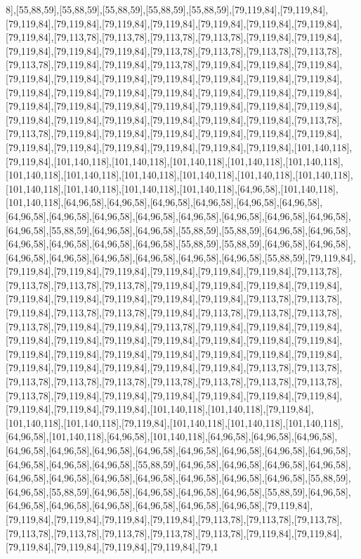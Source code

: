 8],[55,88,59],[55,88,59],[55,88,59],[55,88,59],[55,88,59],[79,119,84],[79,119,84],[79,119,84],[79,119,84],[79,119,84],[79,119,84],[79,119,84],[79,119,84],[79,119,84],[79,119,84],[79,113,78],[79,113,78],[79,113,78],[79,113,78],[79,119,84],[79,119,84],[79,119,84],[79,119,84],[79,119,84],[79,113,78],[79,113,78],[79,113,78],[79,113,78],[79,113,78],[79,119,84],[79,119,84],[79,113,78],[79,119,84],[79,119,84],[79,119,84],[79,119,84],[79,119,84],[79,119,84],[79,119,84],[79,119,84],[79,119,84],[79,119,84],[79,119,84],[79,119,84],[79,119,84],[79,119,84],[79,119,84],[79,119,84],[79,119,84],[79,119,84],[79,119,84],[79,119,84],[79,119,84],[79,119,84],[79,119,84],[79,119,84],[79,119,84],[79,119,84],[79,119,84],[79,119,84],[79,119,84],[79,119,84],[79,113,78],[79,113,78],[79,119,84],[79,119,84],[79,119,84],[79,119,84],[79,119,84],[79,119,84],[79,119,84],[79,119,84],[79,119,84],[79,119,84],[79,119,84],[79,119,84],[101,140,118],[79,119,84],[101,140,118],[101,140,118],[101,140,118],[101,140,118],[101,140,118],[101,140,118],[101,140,118],[101,140,118],[101,140,118],[101,140,118],[101,140,118],[101,140,118],[101,140,118],[101,140,118],[101,140,118],[64,96,58],[101,140,118],[101,140,118],[64,96,58],[64,96,58],[64,96,58],[64,96,58],[64,96,58],[64,96,58],[64,96,58],[64,96,58],[64,96,58],[64,96,58],[64,96,58],[64,96,58],[64,96,58],[64,96,58],[64,96,58],[55,88,59],[64,96,58],[64,96,58],[55,88,59],[55,88,59],[64,96,58],[64,96,58],[64,96,58],[64,96,58],[64,96,58],[64,96,58],[55,88,59],[55,88,59],[64,96,58],[64,96,58],[64,96,58],[64,96,58],[64,96,58],[64,96,58],[64,96,58],[64,96,58],[55,88,59],[79,119,84],[79,119,84],[79,119,84],[79,119,84],[79,119,84],[79,119,84],[79,119,84],[79,113,78],[79,113,78],[79,113,78],[79,113,78],[79,119,84],[79,119,84],[79,119,84],[79,119,84],[79,119,84],[79,119,84],[79,119,84],[79,119,84],[79,119,84],[79,113,78],[79,113,78],[79,119,84],[79,113,78],[79,113,78],[79,119,84],[79,113,78],[79,113,78],[79,113,78],[79,113,78],[79,119,84],[79,119,84],[79,113,78],[79,119,84],[79,119,84],[79,119,84],[79,119,84],[79,119,84],[79,119,84],[79,119,84],[79,119,84],[79,119,84],[79,119,84],[79,119,84],[79,119,84],[79,119,84],[79,119,84],[79,119,84],[79,119,84],[79,119,84],[79,119,84],[79,119,84],[79,119,84],[79,119,84],[79,119,84],[79,113,78],[79,113,78],[79,113,78],[79,113,78],[79,113,78],[79,113,78],[79,113,78],[79,113,78],[79,113,78],[79,113,78],[79,119,84],[79,119,84],[79,119,84],[79,119,84],[79,119,84],[79,119,84],[79,119,84],[79,119,84],[79,119,84],[101,140,118],[101,140,118],[79,119,84],[101,140,118],[101,140,118],[79,119,84],[101,140,118],[101,140,118],[101,140,118],[64,96,58],[101,140,118],[64,96,58],[101,140,118],[64,96,58],[64,96,58],[64,96,58],[64,96,58],[64,96,58],[64,96,58],[64,96,58],[64,96,58],[64,96,58],[64,96,58],[64,96,58],[64,96,58],[64,96,58],[64,96,58],[55,88,59],[64,96,58],[64,96,58],[64,96,58],[64,96,58],[64,96,58],[64,96,58],[64,96,58],[64,96,58],[64,96,58],[64,96,58],[64,96,58],[55,88,59],[64,96,58],[55,88,59],[64,96,58],[64,96,58],[64,96,58],[64,96,58],[55,88,59],[64,96,58],[64,96,58],[64,96,58],[64,96,58],[64,96,58],[64,96,58],[64,96,58],[79,119,84],[79,119,84],[79,119,84],[79,119,84],[79,119,84],[79,113,78],[79,113,78],[79,113,78],[79,113,78],[79,113,78],[79,113,78],[79,113,78],[79,113,78],[79,119,84],[79,119,84],[79,119,84],[79,119,84],[79,119,84],[79,119,84],[79,1